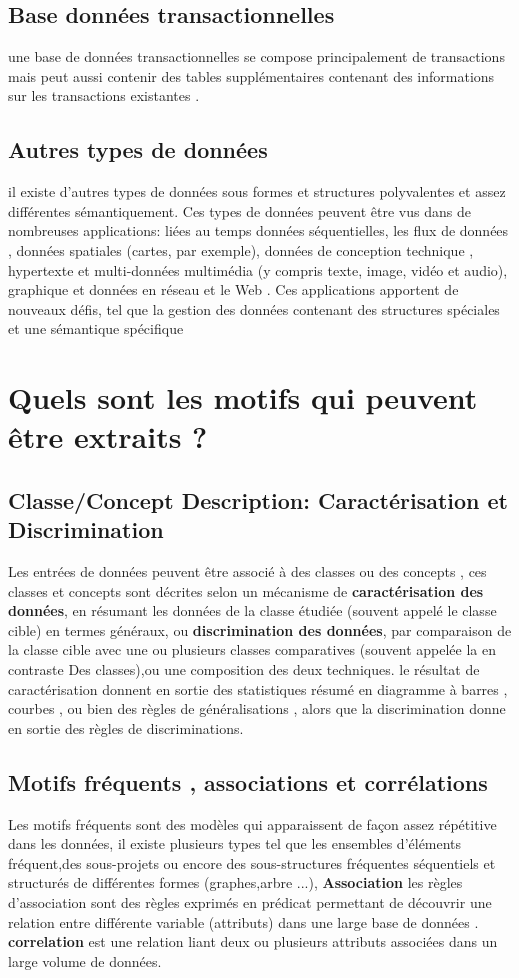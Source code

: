 \documentclass[12pt,a4paper,oneside]{book}
\begin{document}
   \subsection{Base données transactionnelles }
    une base de données transactionnelles se compose principalement de transactions mais peut aussi contenir des tables supplémentaires contenant des informations sur les transactions existantes .
   \subsection{Autres types de données}
   il existe d'autres types de données
   sous formes et  structures polyvalentes et assez différentes
   sémantiquement. Ces types de données peuvent être vus dans de nombreuses applications: liées au temps
   données séquentielles,
    les flux de données , données spatiales (cartes, par exemple), données de conception technique , hypertexte et multi-données multimédia (y compris texte, image, vidéo et audio), graphique et données en réseau
    et le Web . Ces applications apportent de nouveaux
   défis, tel que la gestion des données contenant des structures spéciales et une sémantique spécifique
    \section{Quels sont les motifs qui peuvent être extraits ?}
     \subsection{Classe/Concept Description: Caractérisation
     et Discrimination}
     Les entrées de données peuvent être associé à des classes ou des concepts , ces classes et concepts sont décrites selon un mécanisme 
    de \textbf{caractérisation des données}, en résumant les données de la classe étudiée (souvent appelé le classe cible) en termes généraux, ou \textbf{discrimination des données}, par comparaison de la classe  cible avec une ou plusieurs classes comparatives (souvent appelée la en contraste Des classes),ou une composition des deux techniques. 
    le résultat de caractérisation donnent en sortie des statistiques résumé en diagramme à barres
    ,
    courbes , ou bien des règles de généralisations , alors que la discrimination donne en sortie des règles de discriminations.
    \subsection{Motifs fréquents , associations et corrélations} 
     Les motifs fréquents sont des modèles qui apparaissent de façon assez répétitive dans les données, il existe plusieurs types tel que  les ensembles d'éléments fréquent,des sous-projets ou encore des sous-structures fréquentes séquentiels et structurés  de différentes formes  (graphes,arbre ...),    
     \textbf{Association}
     les règles d’association sont des règles exprimés  en prédicat permettant de découvrir une relation entre différente variable (attributs) dans une large base de données . \\
  \textbf{correlation } est une relation  liant deux ou plusieurs attributs associées dans un large volume de données.
\end{document}
